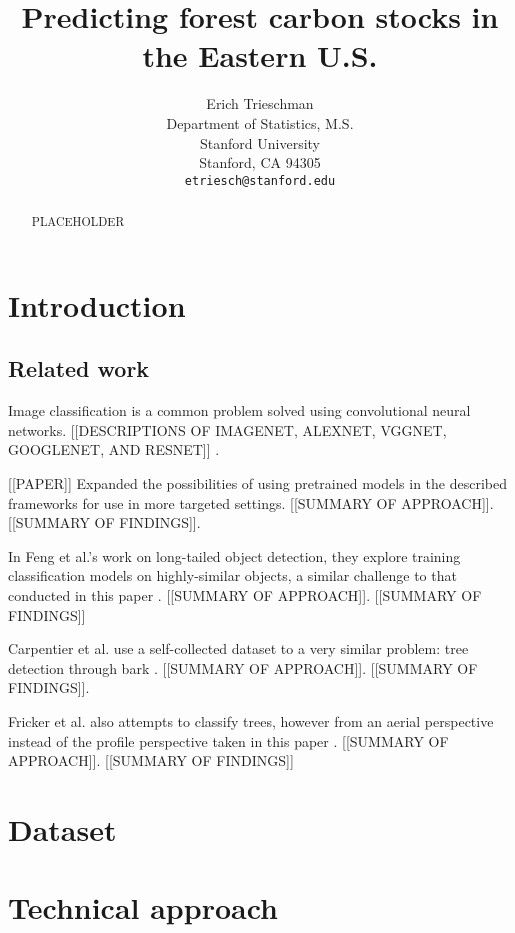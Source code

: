 \documentclass{article}
\title{Predicting forest carbon stocks in the Eastern U.S.}
\author{%
  Erich Trieschman\\
  Department of Statistics, M.S.\\
  Stanford University\\
  Stanford, CA 94305\\
  \texttt{etriesch@stanford.edu} \\
}
\begin{document}
\maketitle

\begin{abstract}
  PLACEHOLDER
\end{abstract}

\section{Introduction}


\subsection{Related work}

Image classification is a common problem solved using convolutional neural networks. [[DESCRIPTIONS OF IMAGENET, ALEXNET, VGGNET, GOOGLENET, AND RESNET]] \cite{VGGNet, GoogLeNET, ResNET}. 

[[PAPER]] Expanded the possibilities of using pretrained models in the described frameworks for use in more targeted settings. [[SUMMARY OF APPROACH]]. [[SUMMARY OF FINDINGS]].

In Feng et al.'s work on long-tailed object detection, they explore training classification models on highly-similar objects, a similar challenge to that conducted in this paper \cite{Feng_2021_ICCV}.  [[SUMMARY OF APPROACH]]. [[SUMMARY OF FINDINGS]]

Carpentier et al. use a self-collected dataset to a very similar problem: tree detection through bark \cite{Carpentier_2018}. [[SUMMARY OF APPROACH]]. [[SUMMARY OF FINDINGS]].

Fricker et al. also attempts to classify trees, however from an aerial perspective instead of the profile perspective taken in this paper \cite{Fricker_RS_2019}. [[SUMMARY OF APPROACH]]. [[SUMMARY OF FINDINGS]]

\section{Dataset}


\section{Technical approach}
\end{document}

